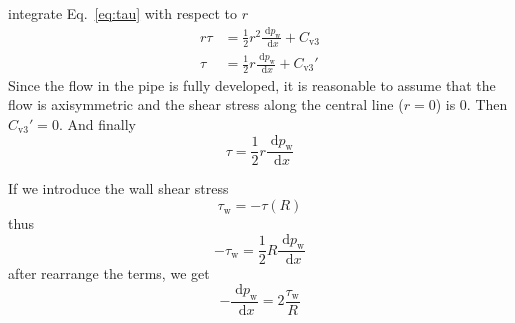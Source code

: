 \documentclass{article}
\newcommand{\dd}{\; \mathrm{d}}
\begin{document}
integrate Eq.~\eqref{eq:tau} with respect to $r$
\begin{align}
	r\tau &= \frac{1}{2}r^2\frac{\dd p_{\text{w}}}{\dd x} + C_{\text{v3}} \nonumber \\
	\tau &= \frac{1}{2}r\frac{\dd p_{\text{w}}}{\dd x} + C_{\text{v3}}'
\end{align}
Since the flow in the pipe is fully developed, it is reasonable to assume that the flow is axisymmetric and the shear stress along the central line ($r=0$) is 0. Then $C_{\text{v3}}' = 0$. And finally
\begin{equation}
	\tau = \frac{1}{2}r\frac{\dd p_{\text{w}}}{\dd x}
\end{equation}

If we introduce the wall shear stress
\begin{equation}
	\tau_{\text{w}} = -\tau(R)
\end{equation}
thus
\begin{equation}
	-\tau_{\text{w}} = \frac{1}{2}R\frac{\dd p_{\text{w}}}{\dd x}
\end{equation}
after rearrange the terms, we get
\begin{equation}
	-\frac{\dd p_{\text{w}}}{\dd x} = 2\frac{\tau_{\text{w}}}{R}
\end{equation}
\end{document}
